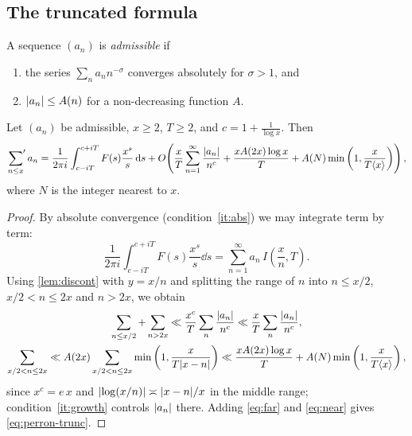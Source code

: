 \subsection{The truncated formula}

\begin{definition}\label{def:admissible}
A sequence $(a_n)$ is \emph{admissible} if
\begin{enumerate}[label=(\roman*)]
\item\label{it:abs} the series $\sum_n a_n n^{-\sigma}$ converges absolutely for $\sigma>1$, and
\item\label{it:growth} $\lvert a_n\rvert\le A(n)$ for a non-decreasing function $A$.
\end{enumerate}
\end{definition}

\begin{theorem}\label{thm:perron}
Let $(a_n)$ be admissible, $x\ge2$, $T\ge2$, and $c=1+\frac{1}{\log x}$. Then
\begin{equation}\label{eq:perron-trunc}
\sideset{}{'}\sum_{n\le x} a_n = \frac{1}{2\pi i}\int_{c-iT}^{c+iT}F(s)\frac{x^{s}}{s}\,\mathrm{d} s
 + O\!\left(\frac{x}{T}\sum_{n=1}^{\infty}\frac{\lvert a_n\rvert}{n^{c}} + \frac{x A(2x)\log x}{T} + A(N)\min\left(1,\frac{x}{T\langle x\rangle}\right)\right),
\end{equation}
where $N$ is the integer nearest to $x$.
\end{theorem}

\begin{proof}
By absolute convergence (condition~\ref{it:abs}) we may integrate term by term:
\[
\frac{1}{2\pi i}\int_{c-iT}^{c+iT}F(s)\frac{x^{s}}{s}\dd s=\sum_{n=1}^{\infty}a_n\, I\!\left(\frac{x}{n},T\right).
\]
Using \cref{lem:discont} with $y=x/n$ and splitting the range of $n$ into $n\le x/2$,
$x/2<n\le 2x$ and $n>2x$, we obtain
\begin{gather}
\sum_{n\le x/2}+\sum_{n>2x} \ll \frac{x^{c}}{T}\sum_{n}\frac{\lvert a_n\rvert}{n^c}\ll \frac{x}{T}\sum_n\frac{\lvert a_n\rvert}{n^{c}},\label{eq:far}\\
\sum_{x/2<n\le2x} \ll A(2x)\sum_{x/2<n\le 2x}\min\left(1,\frac{x}{T\lvert x-n\rvert}\right)\ll \frac{xA(2x)\log x}{T}+A(N)\min\left(1,\frac{x}{T\langle x\rangle}\right),\label{eq:near}
\end{gather}
since $x^{c}=e\,x$ and $\lvert\log(x/n)\rvert\asymp\lvert x-n\rvert/x$ in the middle range; condition~\ref{it:growth}
controls $\lvert a_n\rvert$ there. Adding \eqref{eq:far} and \eqref{eq:near} gives \eqref{eq:perron-trunc}.
\end{proof}

